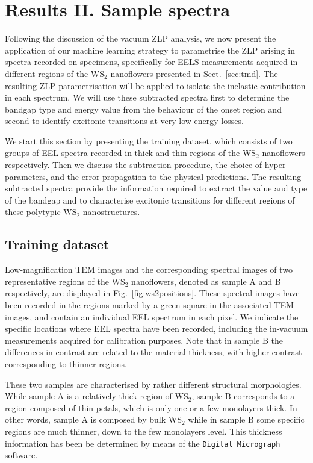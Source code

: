 \section{Results II. Sample spectra}
\label{sec:results_sample}

Following the discussion of the vacuum ZLP analysis, we now
present the application of our machine learning strategy to parametrise the ZLP
arising in spectra recorded on specimens, specifically for
EELS measurements acquired in different regions
of the WS$_2$ nanoflowers presented in Sect.~\ref{sec:tmd}.
%
The resulting ZLP parametrisation will be applied to isolate the inelastic
contribution in each spectrum.
%
We will use these subtracted spectra first to determine the bandgap type and energy 
value from the behaviour of the onset region and second to identify excitonic
transitions at very low energy losses.

We start this section by presenting the training dataset, which consists of two groups of EEL spectra recorded
in thick and thin regions of the WS$_2$  nanoflowers respectively.
%
Then we discuss the subtraction procedure, the choice of hyper-parameters, and the error propagation
to the physical predictions.
%
The resulting subtracted spectra provide the information
required to extract the value and type of the bandgap
and to characterise excitonic transitions for different regions of these polytypic WS$_2$ nanostructures.


\subsection{Training dataset}
%

Low-magnification TEM images and the corresponding
spectral images of two representative regions of
the WS$_2$ nanoflowers, denoted as sample A and B  respectively, are displayed in Fig.~\ref{fig:ws2positions}.
%
These spectral images have been recorded in the regions marked by a green square
in the associated TEM images, and contain an individual EEL spectrum in each pixel.
%
We indicate the specific locations where
EEL spectra have been recorded, including the in-vacuum measurements acquired
for calibration purposes.
%
Note that in sample B  the differences in contrast are related to the material
thickness, with higher contrast corresponding to thinner regions.

These two samples are characterised by rather different structural morphologies.
%
While sample A is a relatively thick region of WS$_2$, sample B corresponds to a region composed 
of thin petals, which is only one or a few monolayers thick. 
%
In other words, sample A is composed by bulk WS$_2$ while in sample B some specific regions
are much thinner, down to the few monolayers level.
%
This thickness information has been be determined
by means of the {\tt Digital~Micrograph} software.

